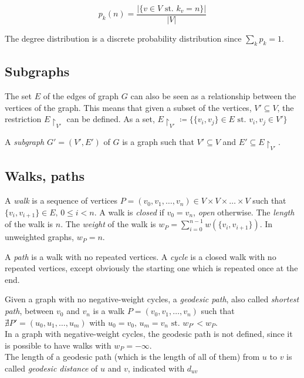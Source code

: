 \documentclass[oneside,openany]{memoir}
\newcommand{\st}{\text{ st. }}
\begin{document}
\begin{equation*}
p_k(n) = \frac{\left\vert{ \{v \in V \st k_v = n\} }\right\vert}{|V|}
\end{equation*}

The degree distribution is a discrete probability distribution since
$\sum_{k} p_k = 1$.

\subsection{Subgraphs}\label{subgraphs}

The set $E$ of the edges of graph $G$ can also be seen as a relationship
between the vertices of the graph. This means that given a subset of the
vertices, $V' \subseteq V$, the restriction $E\restriction_{V'}$ can be
defined. As a set, $E\restriction_{V'} \coloneqq
\{\{v_i, v_j\} \in E \st v_i,v_j \in V'\}$

A \emph{subgraph} $G' = (V', E')$ of $G$ is a graph such that
$V' \subseteq V$ and $E' \subseteq E\restriction_{V'}$.

\subsection{Walks, paths}\label{walks-paths}

A \emph{walk} is a sequence of vertices
$P = (v_0, v_1, \ldots, v_n) \in V \times V \times \ldots \times V$ such
that $\{v_i, v_{i+1}\} \in E,\, 0 \leq i < n$. A walk is \emph{closed} if
$v_0 = v_n$, \emph{open} otherwise. The \emph{length} of the walk is
$n$. The \emph{weight} of the walk is
$w_P = \sum_{i=0}^{n-1} w(\{v_i, v_{i+1}\})$. In unweighted graphs, $w_P = n$.

A \emph{path} is a walk with no repeated vertices. A \emph{cycle} is a
closed walk with no repeated vertices, except obviously the starting one
which is repeated once at the end.

Given a graph with no negative-weight cycles, a \emph{geodesic path},
also called \emph{shortest path}, between $v_0$ and $v_n$ is a walk
$P = (v_0, v_1, \ldots, v_n)$ such that
$\nexists P' = (u_0, u_1, \ldots, u_m)$ with
$u_0 = v_0,\, u_m = v_n \st w_{P'} < w_P$.\\
In a graph with negative-weight cycles, the
geodesic path is not defined, since it is possible to have walks with
$w_P = -\infty$.\\
The length of a geodesic path (which is the length of
all of them) from $u$ to $v$ is called \emph{geodesic distance} of $u$
and $v$, indicated with $d_{uv}$
\end{document}
